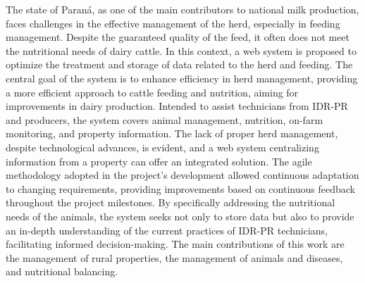 
\begin{abstractutfpr}%
  The state of Paraná, as one of the main contributors to national milk production, faces challenges in the effective management of the herd, especially in feeding management. Despite the guaranteed quality of the feed, it often does not meet the nutritional needs of dairy cattle. In this context, a web system is proposed to optimize the treatment and storage of data related to the herd and feeding. The central goal of the system is to enhance efficiency in herd management, providing a more efficient approach to cattle feeding and nutrition, aiming for improvements in dairy production. Intended to assist technicians from \gls{IDR-PR} and producers, the system covers animal management, nutrition, on-farm monitoring, and property information. The lack of proper herd management, despite technological advances, is evident, and a web system centralizing information from a property can offer an integrated solution. The agile methodology adopted in the project's development allowed continuous adaptation to changing requirements, providing improvements based on continuous feedback throughout the project milestones. By specifically addressing the nutritional needs of the animals, the system seeks not only to store data but also to provide an in-depth understanding of the current practices of \gls{IDR-PR} technicians, facilitating informed decision-making. The main contributions of this work are the management of rural properties, the management of animals and diseases, and nutritional balancing.
\end{abstractutfpr}
